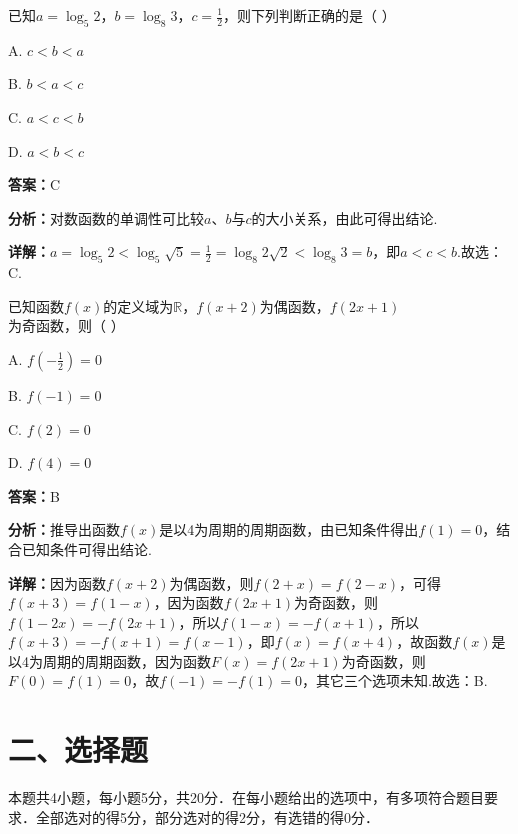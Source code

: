 \begin{question}[points=5]
已知$a=\log_5 2$，$b=\log_8 3$，$c=\frac{1}{2}$，则下列判断正确的是（ ）
\begin{choices}
  \item A. $c<b<a$
  \item B. $b<a<c$
  \item C. $a<c<b$
  \item D. $a<b<c$
\end{choices}
\begin{solution}
\textbf{答案：}C

\textbf{分析：}对数函数的单调性可比较$a$、$b$与$c$的大小关系，由此可得出结论.

\textbf{详解：}$a=\log_5 2<\log_5 \sqrt{5}=\frac{1}{2}=\log_8 2\sqrt{2}<\log_8 3=b$，即$a<c<b$.故选：C.
\end{solution}
\end{question}

\begin{question}[points=5]
已知函数$f(x)$的定义域为$\mathbb{R}$，$f(x+2)$为偶函数，$f(2x+1)$为奇函数，则（ ）
\begin{choices}
  \item A. $f(-\frac{1}{2})=0$
  \item B. $f(-1)=0$
  \item C. $f(2)=0$
  \item D. $f(4)=0$
\end{choices}
\begin{solution}
\textbf{答案：}B

\textbf{分析：}推导出函数$f(x)$是以4为周期的周期函数，由已知条件得出$f(1)=0$，结合已知条件可得出结论.

\textbf{详解：}因为函数$f(x+2)$为偶函数，则$f(2+x)=f(2-x)$，可得$f(x+3)=f(1-x)$，因为函数$f(2x+1)$为奇函数，则$f(1-2x)=-f(2x+1)$，所以$f(1-x)=-f(x+1)$，所以$f(x+3)=-f(x+1)=f(x-1)$，即$f(x)=f(x+4)$，故函数$f(x)$是以4为周期的周期函数，因为函数$F(x)=f(2x+1)$为奇函数，则$F(0)=f(1)=0$，故$f(-1)=-f(1)=0$，其它三个选项未知.故选：B.
\end{solution}
\end{question}

\section*{二、选择题}
本题共4小题，每小题5分，共20分．在每小题给出的选项中，有多项符合题目要求．全部选对的得5分，部分选对的得2分，有选错的得0分．

